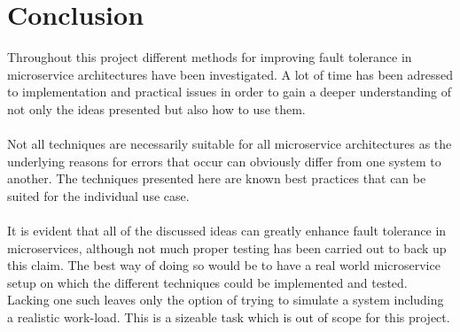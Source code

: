 \section{Conclusion}
Throughout this project different methods for improving fault
tolerance in microservice architectures have been investigated. A lot
of time has been adressed to implementation and practical issues in
order to gain a deeper understanding of not only the ideas presented
but also how to use them.
\\\\
Not all techniques are necessarily suitable for all microservice
architectures as the underlying reasons for errors that occur can
obviously differ from one system to another. The techniques presented
here are known best practices that can be suited for the individual
use case.
\\\\
It is evident that all of the discussed ideas can greatly enhance fault
tolerance in microservices, although not much proper testing has been
carried out to back up this claim. The best way of doing so would be
to have a real world microservice setup on which the different
techniques could be implemented and tested. Lacking one such leaves
only the option of trying to simulate a system including a realistic
work-load. This is a sizeable task which is out of scope for this
project.
